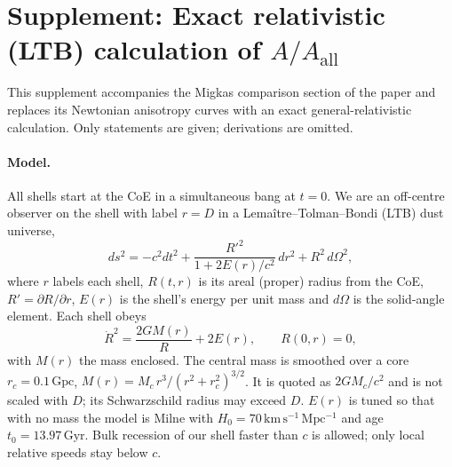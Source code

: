 \documentclass[11pt,a4paper]{article}
\begin{document}
\setcounter{figure}{30}\setcounter{page}{34}
\section*{Supplement: Exact relativistic (LTB) calculation of \(A/A_{\mathrm{all}}\)}

This supplement accompanies the Migkas comparison section of the paper and replaces its Newtonian anisotropy curves with an exact general-relativistic calculation. Only statements are given; derivations are omitted.

\paragraph{Model.} All shells start at the CoE in a simultaneous bang at \(t=0\). We are an off-centre observer on the shell with label \(r=D\) in a Lema\^itre--Tolman--Bondi (LTB) dust universe,
\begin{equation}
ds^{2}=-c^{2}dt^{2}+\frac{R'^{2}}{1+2E(r)/c^{2}}\,dr^{2}+R^{2}\,d\Omega^{2},
\end{equation}
where \(r\) labels each shell, \(R(t,r)\) is its areal (proper) radius from the CoE, \(R'=\partial R/\partial r\), \(E(r)\) is the shell's energy per unit mass and \(d\Omega\) is the solid-angle element. Each shell obeys
\begin{equation}
\dot R^{2}=\frac{2GM(r)}{R}+2E(r),\qquad R(0,r)=0,
\end{equation}
with \(M(r)\) the mass enclosed. The central mass is smoothed over a core \(r_c=0.1\,\mathrm{Gpc}\), \(M(r)=M_c\,r^{3}/(r^{2}+r_c^{2})^{3/2}\). It is quoted as \(2GM_c/c^{2}\) and is not scaled with \(D\); its Schwarzschild radius may exceed \(D\). \(E(r)\) is tuned so that with no mass the model is Milne with \(H_0=70\,\mathrm{km\,s^{-1}\,Mpc^{-1}}\) and age \(t_0=13.97\,\mathrm{Gyr}\). Bulk recession of our shell faster than \(c\) is allowed; only local relative speeds stay below \(c\).
\end{document}
